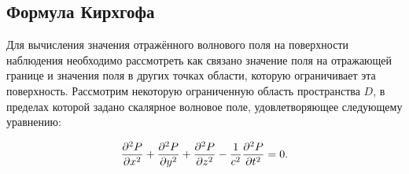 \documentclass[a4paper, fontsize=14pt]{article}
\begin{document}


	
	\subsection{Формула Кирхгофа}
	Для вычисления значения отражённого волнового поля на поверхности наблюдения необходимо 
	рассмотреть как связано значение поля на отражающей границе и значения поля в других точках области, которую ограничивает эта поверхность.   
	Рассмотрим  некоторую ограниченную область пространства $D$, в пределах которой задано скалярное волновое поле, удовлетворяющее следующему уравнению:
	
	\begin{equation}
		\diff[2]{P}{x}  + \diff[2]{P}{y} +
		\diff[2]{P}{z}  - \frac{1}{c^2} \frac{\partial^2 P}{\partial
			t^2} = 0.
		\label{eq:uwav2}
	\end{equation}
	
\end{document}

